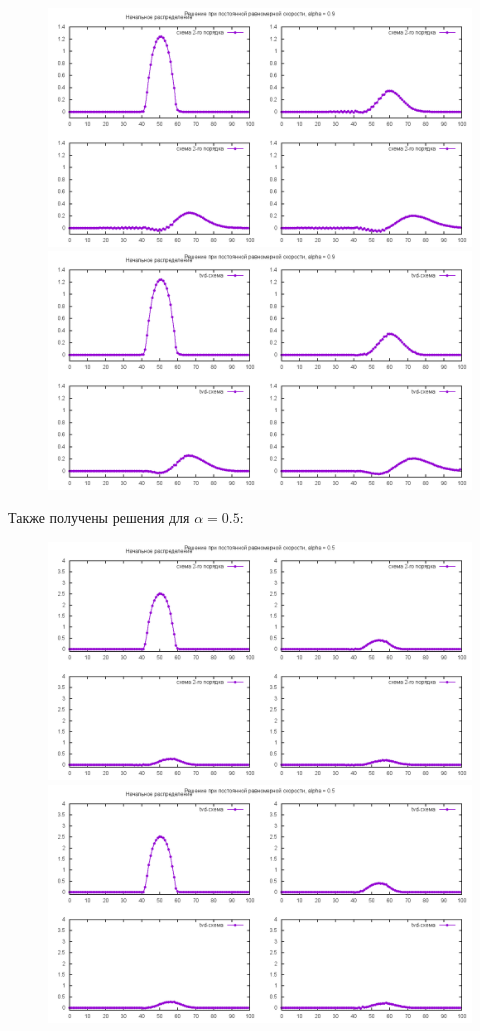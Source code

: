 \begin{figure}
	\includegraphics[width=1.2\linewidth]{pics/alpha07_notvd}
	\includegraphics[width=1.2\linewidth]{pics/alpha07_tvd}
\end{figure}

Также получены решения для $\alpha = 0.5$:

\begin{figure}
	\includegraphics[width=1.2\linewidth]{pics/alpha05_notvd}
	\includegraphics[width=1.2\linewidth]{pics/alpha05_tvd}
\end{figure}
